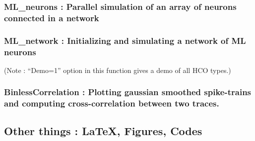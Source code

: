 \documentclass[
]{article}
\begin{document}

\hypertarget{MLm}{%
\subsubsection{ML\_neurons : Parallel simulation of an array of neurons connected in a network}\label{MLm}}



\hypertarget{MLnet}{%
\subsubsection{ML\_network : Initializing and simulating a network of ML neurons}\label{MLnet}}

(Note : ``Demo=1'' option in this function gives a demo of all HCO types.)



\hypertarget{binlesscorrelation-plotting-gaussian-smoothed-spike-trains-and-computing-cross-correlation-between-two-traces.}{%
\subsubsection{BinlessCorrelation : Plotting gaussian smoothed spike-trains and computing cross-correlation between two traces.}\label{binlesscorrelation-plotting-gaussian-smoothed-spike-trains-and-computing-cross-correlation-between-two-traces.}}



\hypertarget{other-things-latex-figures-codes}{%
\subsection{Other things : LaTeX, Figures, Codes}\label{other-things-latex-figures-codes}}
\end{document}
